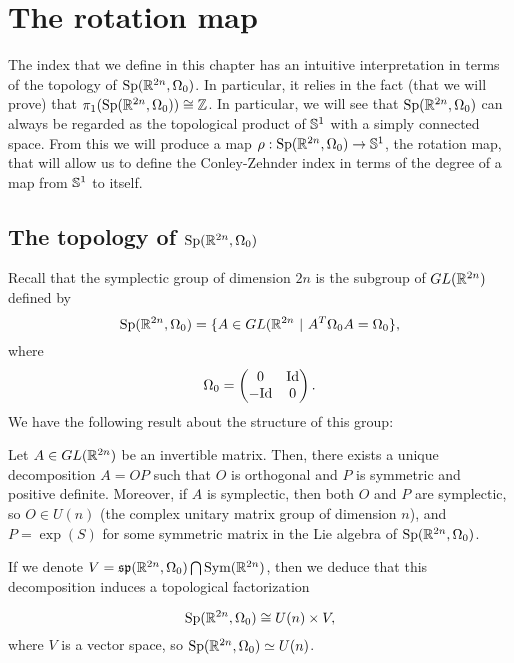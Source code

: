\section{The rotation map}

The index that we define in this chapter has an intuitive interpretation in terms of the topology of $\text{Sp}(\mathbb{R}^{2n},\Omega_0)$. In particular, it relies in the fact (that we will prove) that $\pi_1(\text{Sp}(\mathbb{R}^{2n},\Omega_0)) \cong \mathbb{Z}$. In particular, we will see that $\text{Sp}(\mathbb{R}^{2n},\Omega_0)$ can always be regarded as the topological product of $\mathbb{S}^1$ with a simply connected space. From this we will produce a map $\rho : \text{Sp}(\mathbb{R}^{2n},\Omega_0) \rightarrow \mathbb{S}^1$, the rotation map, that will allow us to define the Conley-Zehnder index in terms of the degree of a map from $\mathbb{S}^1$ to itself.

\subsection{The topology of $\text{Sp}(\mathbb{R}^{2n},\Omega_0)$}

Recall that the symplectic group of dimension $2n$ is the subgroup of $GL(\mathbb{R}^{2n})$ defined by
\[\text{Sp}(\mathbb{R}^{2n}, \Omega_0) = \{A \in GL(\mathbb{R}^{2n} \ | \ A^T \Omega_0 A = \Omega_0\} ,\]
where
\[\Omega_0 = \begin{pmatrix} 0 & \text{Id} \\ - \text{Id} & 0 \end{pmatrix} .\]
We have the following result about the structure of this group:

\begin{theo} Let $A \in GL(\mathbb{R}^{2n})$ be an invertible matrix. Then, there exists a unique decomposition $A = OP$ such that $O$ is orthogonal and $P$ is symmetric and positive definite. Moreover, if $A$ is symplectic, then both $O$ and $P$ are symplectic, so $O \in U(n)$ (the complex unitary matrix group of dimension $n$), and $P = \exp(S)$ for some symmetric matrix in the Lie algebra of $\text{Sp}(\mathbb{R}^{2n},\Omega_0)$.

If we denote $V = \mathfrak{sp}(\mathbb{R}^{2n},\Omega_0) \bigcap \text{Sym}(\mathbb{R}^{2n})$, then we deduce that this decomposition induces a topological factorization

\[\text{Sp}(\mathbb{R}^{2n}, \Omega_0) \cong U(n) \times V ,\]
where $V$ is a vector space, so $\text{Sp}(\mathbb{R}^{2n},\Omega_0) \simeq U(n)$.
\end{theo}

